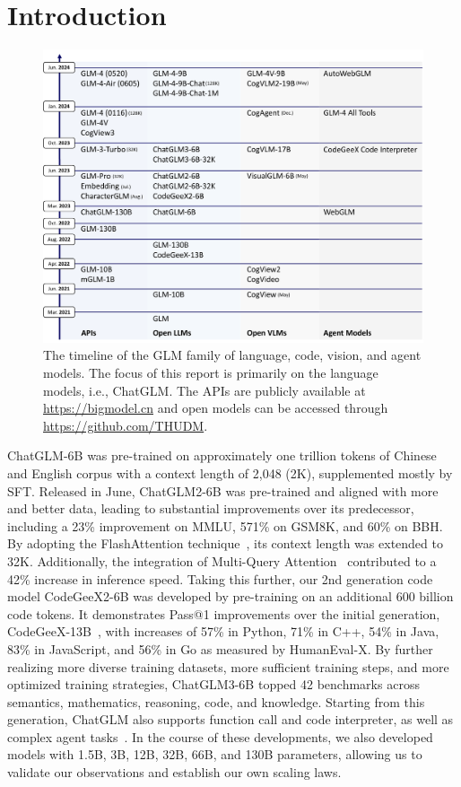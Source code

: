 \section{Introduction}

\begin{figure}[tb]
    \centering
    \includegraphics[width=\linewidth]{figs/glm4-history6.pdf}
    \caption{The timeline of the GLM family of language, code, vision, and agent models. The focus of this report is primarily on the language models, i.e., ChatGLM. The APIs are publicly available at \url{https://bigmodel.cn} and open models can be accessed through \url{https://github.com/THUDM}.}
    \label{fig:timeline}
\end{figure}

ChatGLM-6B was pre-trained on approximately one trillion tokens of Chinese and English corpus with a context length of 2,048 (2K), supplemented mostly by SFT.
Released in June, ChatGLM2-6B was pre-trained and aligned with more and better data, leading to substantial improvements over its predecessor, including a 23\% improvement on MMLU, 571\% on GSM8K, and 60\% on BBH. 
By adopting the FlashAttention technique~\cite{dao2022flashattention}, its context length was extended to 32K. 
Additionally, the integration of Multi-Query Attention~\cite{shazeer2019fast} contributed to a 42\% increase in inference speed. 
Taking this further, our 2nd generation code model CodeGeeX2-6B was developed by pre-training on an additional 600 billion code tokens. 
It demonstrates Pass@1 improvements over the initial generation, CodeGeeX-13B~\cite{zheng2023codegeex}, with increases of 57\% in Python, 71\% in C++, 54\% in Java, 83\% in JavaScript, and 56\% in Go  as measured by HumanEval-X. 
By further realizing more diverse training datasets, more sufficient training steps, and more optimized training strategies, ChatGLM3-6B topped 42 benchmarks across semantics, mathematics, reasoning, code, and knowledge. 
Starting from this generation, ChatGLM also supports function call and code interpreter, as well as complex agent tasks~\cite{deng2023mind2web,shridhar2020alfworld,yao2022webshop}. 
In the course of these developments, we also developed models with 1.5B, 3B, 12B, 32B, 66B, and 130B parameters, allowing us to validate our observations and establish our own scaling laws. 



